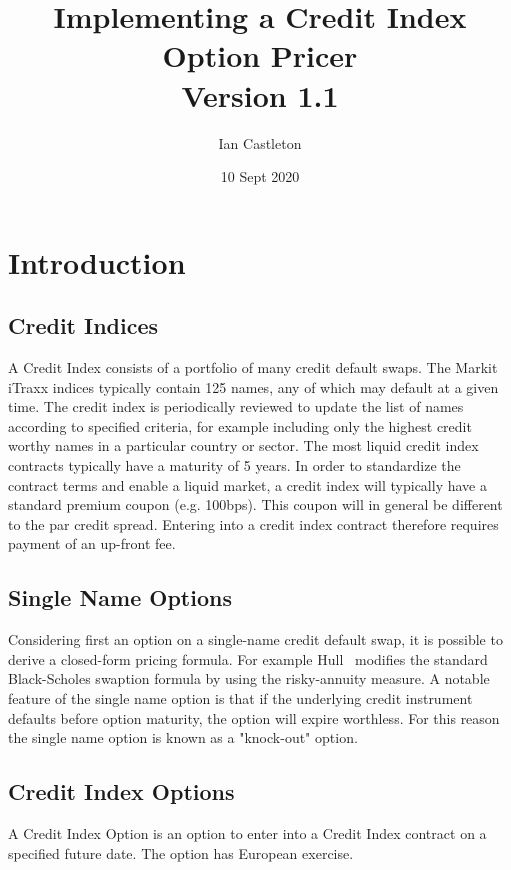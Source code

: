 \documentclass[11pt]{article}
\begin{document}

\title{Implementing a Credit Index Option Pricer\\
	\large Version 1.1}

\date{10 Sept 2020}
\author{Ian Castleton}
\maketitle


\section{Introduction}

\subsection{Credit Indices}
A Credit Index consists of a portfolio of many credit default swaps. The Markit iTraxx indices typically contain 125 names, any of which may default at a given time. The credit index is periodically reviewed to update the list of names according to specified criteria, for example including only the highest credit worthy names in a particular country or sector. The most liquid credit index contracts typically have a maturity of 5 years. In order to standardize the contract terms and enable a liquid market, a credit index will typically have a standard premium coupon (e.g. 100bps). This coupon will in general be different to the par credit spread. Entering into a credit index contract therefore requires payment of an up-front fee.

\subsection{Single Name Options}
Considering first an option on a single-name credit default swap, it is possible to derive a closed-form pricing formula. For example Hull~\cite{HullCreditOption} modifies the standard Black-Scholes swaption formula by using the risky-annuity measure. A notable feature of the single name option is that if the underlying credit instrument defaults before option maturity, the option will expire worthless. For this reason the single name option is known as a "knock-out" option.

\subsection{Credit Index Options}
A Credit Index Option is an option to enter into a Credit Index contract on a specified future date. The option has European exercise.
\end{document}
